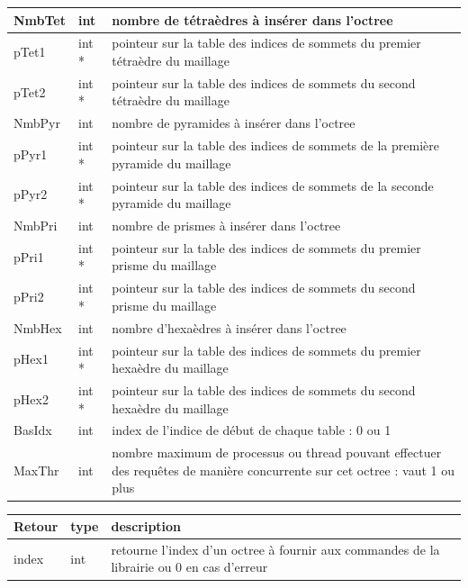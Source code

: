 \documentclass[a4paper,12pt]{article}
\begin{document}
\begin{tabular}{|m{2cm}|m{2cm}|m{10cm}|}
\hline
NmbTet     & int      & nombre de tétraèdres à insérer dans l'octree  \\
\hline
pTet1      & int *    & pointeur sur la table des indices de sommets du premier tétraèdre du maillage \\
\hline
pTet2      & int *    & pointeur sur la table des indices de sommets du second tétraèdre du maillage \\
\hline
NmbPyr     & int      & nombre de pyramides à insérer dans l'octree  \\
\hline
pPyr1      & int *    & pointeur sur la table des indices de sommets de la première pyramide du maillage \\
\hline
pPyr2      & int *    & pointeur sur la table des indices de sommets de la seconde pyramide du maillage \\
\hline
NmbPri     & int      & nombre de prismes à insérer dans l'octree  \\
\hline
pPri1      & int *    & pointeur sur la table des indices de sommets du premier prisme du maillage \\
\hline
pPri2      & int *    & pointeur sur la table des indices de sommets du second prisme du maillage \\
\hline
NmbHex     & int      & nombre d'hexaèdres à insérer dans l'octree  \\
\hline
pHex1      & int *    & pointeur sur la table des indices de sommets du premier hexaèdre du maillage \\
\hline
pHex2      & int *    & pointeur sur la table des indices de sommets du second hexaèdre du maillage \\
\hline
BasIdx     & int      & index de l'indice de début de chaque table : 0 ou 1 \\
\hline
MaxThr     & int      & nombre maximum de processus ou thread pouvant effectuer des requêtes de manière concurrente sur cet octree : vaut 1 ou plus \\
\hline
\end{tabular}

\medskip

\begin{tabular}{|m{2cm}|m{2cm}|m{10cm}|}
\hline
Retour     & type   & description \\
\hline
index      & int    & retourne l'index d'un octree à fournir aux commandes de la librairie ou 0 en cas d'erreur \\
\hline
\end{tabular}
\end{document}
